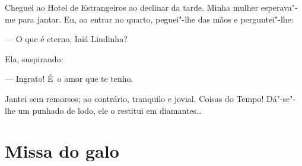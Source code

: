 \begin{linenumbers}
Cheguei ao Hotel de Estrangeiros ao declinar da tarde. Minha mulher
esperava"-me para jantar. Eu, ao entrar no quarto, peguei"-lhe das mãos e
perguntei"-lhe:

--- O que é eterno, Iaiá Lindinha?

Ela, suspirando:

--- Ingrato! É~o amor que te tenho.

Jantei sem remorsos; ao contrário, tranquilo e jovial. Coisas do Tempo!
Dá"-se"-lhe um punhado de lodo, ele o restitui em diamantes\ldots{}

\end{linenumbers}

\chapter{Missa do galo}


